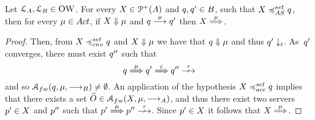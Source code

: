   \begin{lemma}
  \label{lem:empty-nleqx}
  \label{lem:X-must-perform-visible-action}
  Let $\mathcal{L}_A, \mathcal{L}_B \in \textsc{OW}$.
  For every $X \in \mathcal{P}^{+}( A )$ and
  $q, q' \in B$,
  such that $X \asleqset \serverB$, then
  for every $\mu \in \Act$, if
  $X \mathrel{\Downarrow} \mu$ and $q \mathrel{\overset{\mu}\longrightarrow} q'$ then $X \mathrel{\overset{\mu} \Longrightarrow}$.
  \end{lemma}
  \begin{proof}
  Then, from $X \cnvleqset \serverB$ and $X \mathrel{\Downarrow} \mu$ we have that
  $q \mathrel{\Downarrow} \mu$ and thus $q' \downarrow_i$.
  As~$q'$ converges, there must exist $q''$ such that
  $$
  \serverB \wt{\mu} \serverB' \wt{\varepsilon} \serverB'' \stable
  $$
  and so $\accfwp{ \serverB }{ \mu }{ \st{}_\StatesB } \neq \emptyset$.
  An application of the hypothesis $X \accleqset \serverB$ implies that there exists
  a set $\widehat{ O } \in \accfwp{ X }{ \mu }{ \st{}_\StatesA }$,
  and thus there exist two servers $p' \in X$ and $p''$
  such that $\serverA' \wt{\mu} \serverA'' \stable$.
  Since $ p' \in X $ it follows that $X \mathrel{\overset{\mu} \Longrightarrow}$.
  \end{proof}


